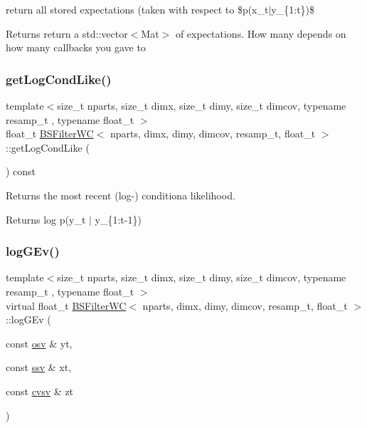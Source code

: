 return all stored expectations (taken with respect to \$p(x\+\_\+t$\vert$y\+\_\+\{1\+:t\})\$ 

\begin{DoxyReturn}{Returns}
return a std\+::vector$<$\+Mat$>$ of expectations. How many depends on how many callbacks you gave to 
\end{DoxyReturn}
\mbox{\label{classBSFilterWC_a26e23f7f1e17e3fb3e6a3bfdb633cc2b}} 
\subsubsection{\texorpdfstring{get\+Log\+Cond\+Like()}{getLogCondLike()}}
{\footnotesize\ttfamily template$<$size\+\_\+t nparts, size\+\_\+t dimx, size\+\_\+t dimy, size\+\_\+t dimcov, typename resamp\+\_\+t , typename float\+\_\+t $>$ \\
float\+\_\+t \hyperlink{classBSFilterWC}{B\+S\+Filter\+WC}$<$ nparts, dimx, dimy, dimcov, resamp\+\_\+t, float\+\_\+t $>$\+::get\+Log\+Cond\+Like (\begin{DoxyParamCaption}{ }\end{DoxyParamCaption}) const}



Returns the most recent (log-\/) conditiona likelihood. 

\begin{DoxyReturn}{Returns}
log p(y\+\_\+t $\vert$ y\+\_\+\{1\+:t-\/1\}) 
\end{DoxyReturn}
\mbox{\label{classBSFilterWC_aa990c3307d1b3fd5fd980c5c770ec0be}} 
\subsubsection{\texorpdfstring{log\+G\+Ev()}{logGEv()}}
{\footnotesize\ttfamily template$<$size\+\_\+t nparts, size\+\_\+t dimx, size\+\_\+t dimy, size\+\_\+t dimcov, typename resamp\+\_\+t , typename float\+\_\+t $>$ \\
virtual float\+\_\+t \hyperlink{classBSFilterWC}{B\+S\+Filter\+WC}$<$ nparts, dimx, dimy, dimcov, resamp\+\_\+t, float\+\_\+t $>$\+::log\+G\+Ev (\begin{DoxyParamCaption}\item[{const \hyperlink{classBSFilterWC_a48b0c7f1a1cf7e57300cf820e74057ce}{osv} \&}]{yt,  }\item[{const \hyperlink{classBSFilterWC_afff292a8cc15505cc3aa244135203c78}{ssv} \&}]{xt,  }\item[{const \hyperlink{classBSFilterWC_a52f5a46901a821fffe82937543220a1a}{cvsv} \&}]{zt }\end{DoxyParamCaption})\hspace{0.3cm}{\ttfamily [pure virtual]}}



